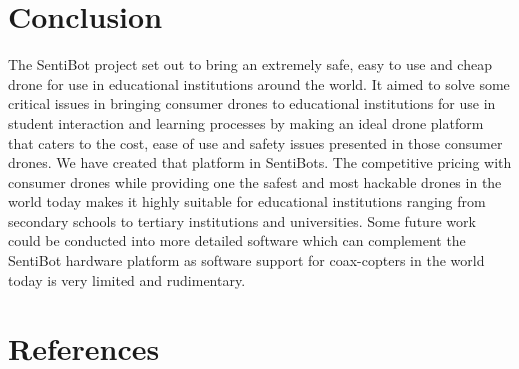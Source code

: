 \documentclass[12pt]{article}
\begin{document}
\section{Conclusion}

The SentiBot project set out to bring an extremely safe, easy to use and cheap drone for use in educational institutions around the world. It aimed to solve some critical issues in bringing consumer drones to educational institutions for use in student interaction and learning processes by making an ideal drone platform that caters to the cost, ease of use and safety issues presented in those consumer drones. We have created that platform in SentiBots. The competitive pricing with consumer drones while providing one the safest and most hackable drones in the world today makes it highly suitable for educational institutions ranging from secondary schools to tertiary institutions and universities. 
Some future work could be conducted into more detailed software which can complement the SentiBot hardware platform as software support for coax-copters in the world today is very limited and rudimentary.

\section{References}



\end{document}
